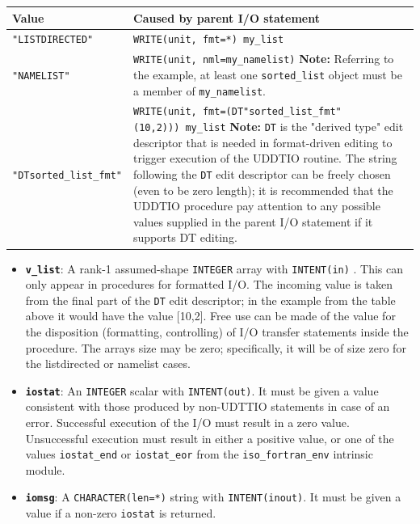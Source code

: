 \documentclass[
]{scrartcl}
\providecommand{\tightlist}{%
  \setlength{\itemsep}{0pt}\setlength{\parskip}{0pt}}
\begin{document}
\begin{longtable}[]{@{}ll@{}}
\toprule\noalign{}
Value & Caused by parent I/O statement \\
\midrule\noalign{}
\endhead
\bottomrule\noalign{}
\endlastfoot
\texttt{"LISTDIRECTED"} & \texttt{WRITE(unit,\ fmt=*)\ my\_list} \\
\texttt{"NAMELIST"} & \texttt{WRITE(unit,\ nml=my\_namelist)}
\textbf{Note:} Referring to the example, at least one
\texttt{sorted\_list} object must be a member of
\texttt{my\_namelist}. \\
\texttt{"DTsorted\_list\_fmt"} &
\texttt{WRITE(unit,\ fmt=\textquotesingle{}(DT"sorted\_list\_fmt"(10,2))\textquotesingle{})\ my\_list}
\textbf{Note:} \texttt{DT} is the "derived type" edit descriptor that is
needed in format-driven editing to trigger execution of the UDDTIO
routine. The string following the \texttt{DT} edit descriptor can be
freely chosen (even to be zero length); it is recommended that the
UDDTIO procedure pay attention to any possible values supplied in the
parent I/O statement if it supports DT editing. \\
\end{longtable}

\begin{itemize}
\tightlist
\item
  \textbf{\texttt{v\_list}}: A rank-1 assumed-shape \texttt{INTEGER}
  array with \texttt{INTENT(in)} . This can only appear in procedures
  for formatted I/O. The incoming value is taken from the final part of
  the \texttt{DT} edit descriptor; in the example from the table above
  it would have the value {[}10,2{]}. Free use can be made of the value
  for the disposition (formatting, controlling) of I/O transfer
  statements inside the procedure. The array\textquotesingle s size may
  be zero; specifically, it will be of size zero for the listdirected or
  namelist cases.
\item
  \textbf{\texttt{iostat}}: An \texttt{INTEGER} scalar with
  \texttt{INTENT(out)}. It must be given a value consistent with those
  produced by non-UDTTIO statements in case of an error. Successful
  execution of the I/O must result in a zero value. Unsuccessful
  execution must result in either a positive value, or one of the values
  \texttt{iostat\_end} or \texttt{iostat\_eor} from the
  \texttt{iso\_fortran\_env} intrinsic module.
\item
  \textbf{\texttt{iomsg}}: A \texttt{CHARACTER(len=*)} string with
  \texttt{INTENT(inout)}. It must be given a value if a non-zero
  \texttt{iostat} is returned.
\end{itemize}
\end{document}
